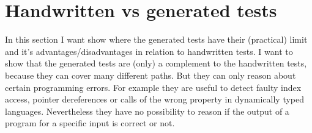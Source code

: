 \section{Handwritten vs generated tests}
In this section I want show where the generated tests have their (practical) limit and it's advantages/disadvantages in relation to handwritten tests.
I want to show that the generated tests are (only) a complement to the handwritten tests, because they can cover many different paths. But they can only reason about certain programming errors. For example they are useful to detect faulty index access, pointer dereferences or calls of the wrong property in dynamically typed languages. Nevertheless they have no possibility to reason if the output of a program for a specific input is correct or not.